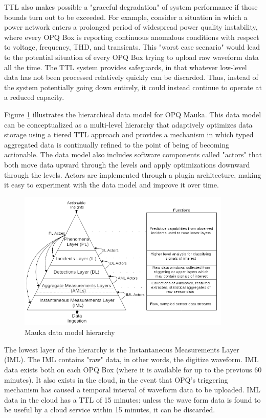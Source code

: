  TTL also makes possible a "graceful degradation" of system performance if those bounds turn out to be exceeded. For example, consider a situation in which a power network enters a prolonged period of widespread power quality instability, where every OPQ Box is reporting continuous anomalous conditions with respect to voltage, frequency, THD, and transients.  This "worst case scenario" would lead to the potential situation of every OPQ Box trying to upload raw waveform data all the time. The TTL system provides safeguards, in that whatever low-level data has not been processed relatively quickly can be discarded.  Thus, instead of the system potentially going down entirely, it could instead continue to operate at a reduced capacity.

Figure \ref{fig:mauka-data-model} illustrates the hierarchical data model for OPQ Mauka. This data model can be conceptualized as a multi-level hierarchy that adaptively optimizes data storage using a tiered TTL approach and provides a mechanism in which typed aggregated data is continually refined to the point of being of becoming actionable. The data model also includes software components called "actors" that both move data upward through the levels and apply optimizations downward through the levels. Actors are implemented through a plugin architecture, making it easy to experiment with the data model and improve it over time.

\begin{figure}
\center \includegraphics[width=4in]{images/mauka/mauka-data-model.png}
\caption{Mauka data model hierarchy}
\label{fig:mauka-data-model}
\end{figure}

The lowest layer of the hierarchy is the Instantaneous Measurements Layer (IML). The IML contains "raw" data, in other words, the digitize waveform.  IML data exists both on each OPQ Box (where it is available for up to the previous 60 minutes). It also exists in the cloud, in the event that OPQ's triggering mechanism has caused a temporal interval of waveform data to be uploaded. IML data in the cloud has a TTL of 15 minutes: unless the wave form data is found to be useful by a cloud service within 15 minutes, it can be discarded.


